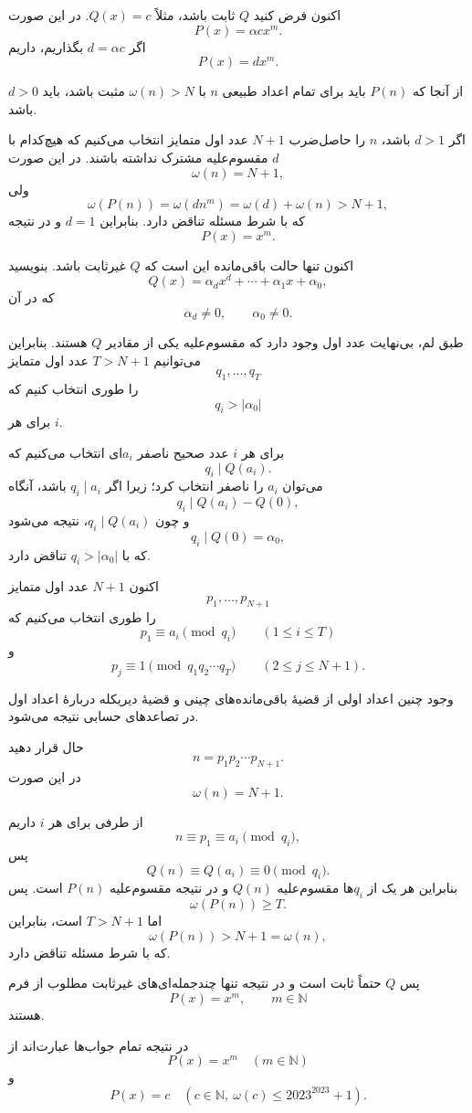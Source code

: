 اکنون فرض کنید $Q$ ثابت باشد، مثلاً $Q(x)=c$. در این صورت
$$
P(x)=\alpha cx^m.
$$
اگر $d=\alpha c$ بگذاریم، داریم
$$
P(x)=dx^m.
$$

از آنجا که $P(n)$ باید برای تمام اعداد طبیعی $n$ با $\omega(n)>N$ مثبت باشد، باید $d>0$ باشد.

اگر $d>1$ باشد، $n$ را حاصل‌ضرب $N+1$ عدد اول متمایز انتخاب می‌کنیم که هیچ‌کدام با $d$ مقسوم‌علیه مشترک نداشته باشند. در این صورت
$$
\omega(n)=N+1,
$$
ولی
$$
\omega(P(n))=\omega(dn^m)=\omega(d)+\omega(n)>N+1,
$$
که با شرط مسئله تناقض دارد. بنابراین $d=1$ و در نتیجه
$$
P(x)=x^m.
$$

اکنون تنها حالت باقی‌مانده این است که $Q$ غیرثابت باشد. بنویسید
$$
Q(x)=\alpha_dx^d+\cdots+\alpha_1x+\alpha_0,
$$
که در آن
$$
\alpha_d\neq0,\qquad\alpha_0\neq0.
$$

طبق لم، بی‌نهایت عدد اول وجود دارد که مقسوم‌علیه یکی از مقادیر $Q$ هستند. بنابراین می‌توانیم $T>N+1$ عدد اول متمایز
$$
q_1,\ldots,q_T
$$
را طوری انتخاب کنیم که
$$
q_i>|\alpha_0|
$$
برای هر $i$.

برای هر $i$ عدد صحیح ناصفر $a_i$ای انتخاب می‌کنیم که
$$
q_i\mid Q(a_i).
$$
می‌توان $a_i$ را ناصفر انتخاب کرد؛ زیرا اگر $q_i\mid a_i$ باشد، آنگاه
$$
q_i\mid Q(a_i)-Q(0),
$$
و چون $q_i\mid Q(a_i)$، نتیجه می‌شود
$$
q_i\mid Q(0)=\alpha_0,
$$
که با $q_i>|\alpha_0|$ تناقض دارد.

اکنون $N+1$ عدد اول متمایز
$$
p_1,\ldots,p_{N+1}
$$
را طوری انتخاب می‌کنیم که
$$
p_1\equiv a_i\pmod{q_i}
\qquad(1\leq i\leq T)
$$
و
$$
p_j\equiv1\pmod{q_1q_2\cdots q_T}
\qquad(2\leq j\leq N+1).
$$

وجود چنین اعداد اولی از قضیهٔ باقی‌مانده‌های چینی و قضیهٔ دیریکله دربارهٔ اعداد اول در تصاعدهای حسابی نتیجه می‌شود.

حال قرار دهید
$$
n=p_1p_2\cdots p_{N+1}.
$$
در این صورت
$$
\omega(n)=N+1.
$$

از طرفی برای هر $i$ داریم
$$
n\equiv p_1\equiv a_i\pmod{q_i},
$$
پس
$$
Q(n)\equiv Q(a_i)\equiv0\pmod{q_i}.
$$
بنابراین هر یک از $q_i$ها مقسوم‌علیه $Q(n)$ و در نتیجه مقسوم‌علیه $P(n)$ است. پس
$$
\omega(P(n))\geq T.
$$
اما $T>N+1$ است، بنابراین
$$
\omega(P(n))>N+1=\omega(n),
$$
که با شرط مسئله تناقض دارد.

پس $Q$ حتماً ثابت است و در نتیجه تنها چندجمله‌ای‌های غیرثابت مطلوب از فرم
$$
P(x)=x^m,\qquad m\in\mathbb{N}
$$
هستند.

در نتیجه تمام جواب‌ها عبارت‌اند از
$$
\boxed{P(x)=x^m\quad(m\in\mathbb{N})}
$$
و
$$
\boxed{P(x)=c\quad(c\in\mathbb{N},\ \omega(c)\leq2023^{2023}+1)}.
$$